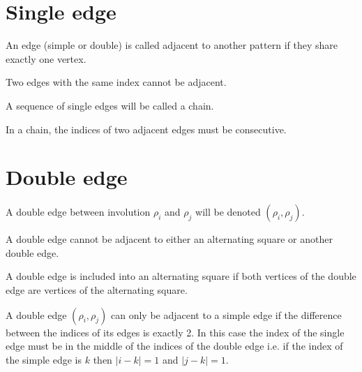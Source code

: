 \section{Single edge}

\begin{definition}
  An edge (simple or double) is called adjacent to another pattern if they share exactly one vertex.
\end{definition}

\begin{proposition}
  \label{fixed-only-1}
  Two edges with the same index cannot be adjacent.
\end{proposition}

\begin{definition}
  A sequence of single edges will be called a chain.
\end{definition}

\begin{proposition}
  \label{chain-consecutive}
  In a chain, the indices of two adjacent edges must be consecutive.
\end{proposition}

\section{Double edge}

\begin{notation}
  A double edge between involution $\rho_i$ and $\rho_j$ will be denoted $(\rho_i, \rho_j)$.
\end{notation}

\begin{proposition}
  A double edge cannot be adjacent to either an alternating square or another double edge.
\end{proposition}

\begin{definition}
  A double edge is included into an alternating square if both vertices of the double edge are vertices of the alternating square.
\end{definition}

\begin{proposition}
  \label{adjacent-double}
  A double edge $(\rho_i, \rho_j)$ can only be adjacent to a simple edge if the difference between the indices of its edges is exactly 2. In this case the index of the single edge must be in the middle of the indices of the double edge i.e. if the index of the simple edge is $k$ then $|i-k| = 1$ and $|j-k| = 1$.
\end{proposition}

